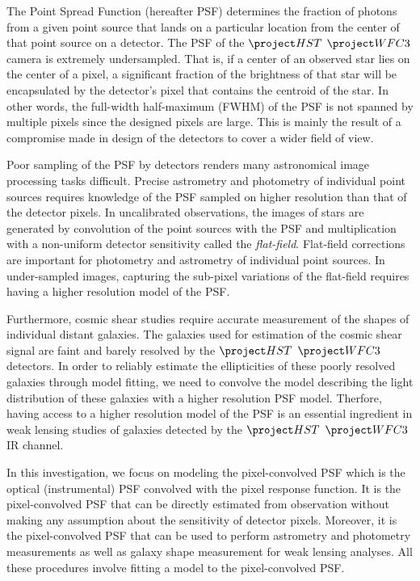 The Point Spread Function (hereafter PSF) determines the fraction of photons from a given point source that lands on a particular location 
from the center of that point source on a detector. The PSF of the $\hst$ $\wfc$ camera is extremely undersampled. That is, if a center of an observed star lies 
on the center of a pixel, a significant fraction of the brightness of that star will be 
encapsulated by the detector's pixel that contains the centroid of the star.
In other words, the full-width half-maximum (FWHM) of the PSF is not spanned by multiple pixels since the designed 
pixels are large. This is mainly the result of a compromise made in design of the detectors to cover a wider field of view.

Poor sampling of the PSF by detectors renders many astronomical image processing tasks difficult. Precise astrometry and photometry 
of individual point sources requires knowledge of the PSF sampled on higher resolution than that of the detector pixels. 
In uncalibrated observations, the images of stars are generated by convolution of the point sources with the PSF and multiplication 
with a non-uniform detector sensitivity called the \emph{flat-field}. Flat-field corrections are important for photometry and astrometry of 
individual point sources. In under-sampled images, capturing the sub-pixel variations of the flat-field requires having a higher resolution 
model of the PSF. 

Furthermore, cosmic shear studies require accurate measurement of the shapes of individual distant galaxies. The galaxies used for estimation 
of the cosmic shear signal are faint and barely resolved by the $\hst$ $\wfc$ detectors. In order to reliably estimate the ellipticities of these poorly 
resolved galaxies through model fitting, we need to convolve the model describing the light distribution of these galaxies with a higher resolution PSF model. 
Therfore, having access to a higher resolution model of the PSF is an essential ingredient in weak lensing studies of galaxies detected by the $\hst$ $\wfc$ IR 
channel.   

In this investigation, we focus on modeling the pixel-convolved PSF which is the optical (instrumental) PSF convolved with the 
pixel response function. It is the pixel-convolved PSF that can be directly estimated from observation without making any assumption 
about the sensitivity of detector pixels. Moreover, it is the pixel-convolved PSF that can be used to perform astrometry and photometry measurements as well as 
galaxy shape measurement for weak lensing analyses. All these procedures involve fitting a model to the pixel-convolved PSF. 

